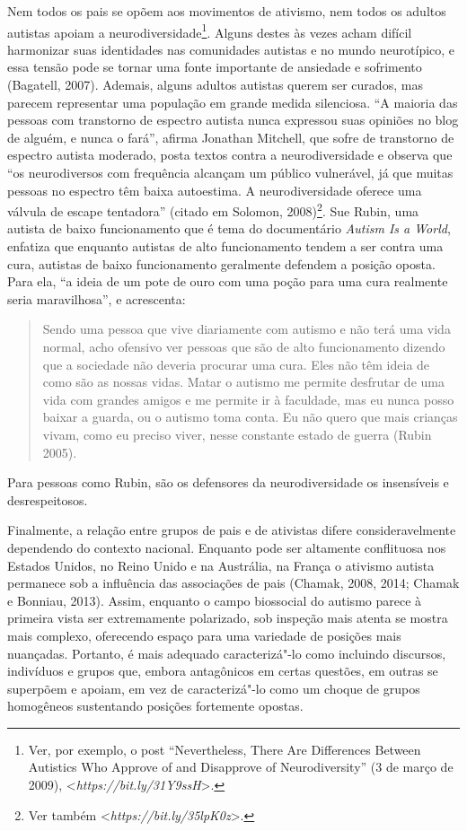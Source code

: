 Nem todos os pais se opõem aos movimentos de ativismo, nem todos os
adultos autistas apoiam a neurodiversidade\footnote[15]{Ver, por exemplo, o post ``Nevertheless, There Are Differences
Between Autistics Who Approve of and Disapprove of Neurodiversity'' (3
de março de 2009),
\textless{}\emph{https://bit.ly/31Y9ssH}\textgreater{}.}. Alguns
destes às vezes acham difícil harmonizar suas identidades nas
comunidades autistas e no mundo neurotípico, e essa tensão pode se
tornar uma fonte importante de ansiedade e sofrimento (Bagatell, 2007).
Ademais, alguns adultos autistas querem ser curados, mas parecem
representar uma população em grande medida silenciosa. ``A maioria das
pessoas com transtorno de espectro autista nunca expressou suas opiniões
no blog de alguém, e nunca o fará'', afirma Jonathan Mitchell, que sofre
de transtorno de espectro autista moderado, posta textos contra a
neurodiversidade e observa que ``os neurodiversos com frequência
alcançam um público vulnerável, já que muitas pessoas no espectro têm
baixa autoestima. A neurodiversidade oferece uma válvula de escape
tentadora'' (citado em Solomon, 2008)\footnote[16]{Ver também \textless{}\emph{https://bit.ly/35lpK0z}\textgreater{}.}. Sue Rubin,
uma autista de baixo funcionamento que é tema do documentário
\emph{Autism Is a World}, enfatiza que enquanto autistas de alto
funcionamento tendem a ser contra uma cura, autistas de baixo
funcionamento geralmente defendem a posição oposta. Para ela, ``a ideia
de um pote de ouro com uma poção para uma cura realmente seria
maravilhosa'', e acrescenta:

\begin{quote}
Sendo uma pessoa que vive diariamente com autismo e não terá uma vida
normal, acho ofensivo ver pessoas que são de alto funcionamento dizendo
que a sociedade não deveria procurar uma cura. Eles não têm ideia de
como são as nossas vidas. Matar o autismo me permite desfrutar de uma
vida com grandes amigos e me permite ir à faculdade, mas eu nunca posso
baixar a guarda, ou o autismo toma conta. Eu não quero que mais crianças
vivam, como eu preciso viver, nesse constante estado de guerra (Rubin
2005).
\end{quote}

Para pessoas como Rubin, são os defensores da neurodiversidade os
insensíveis e desrespeitosos.

Finalmente, a relação entre grupos de pais e de ativistas difere
consideravelmente dependendo do contexto nacional. Enquanto pode ser
altamente conflituosa nos Estados Unidos, no Reino Unido e na Austrália,
na França o ativismo autista permanece sob a influência das associações
de pais (Chamak, 2008, 2014; Chamak e Bonniau, 2013). Assim, enquanto o
campo biossocial do autismo parece à primeira vista ser extremamente
polarizado, sob inspeção mais atenta se mostra mais complexo, oferecendo
espaço para uma variedade de posições mais nuançadas. Portanto, é mais
adequado caracterizá"-lo como incluindo discursos, indivíduos e grupos
que, embora antagônicos em certas questões, em outras se superpõem e
apoiam, em vez de caracterizá"-lo como um choque de grupos homogêneos
sustentando posições fortemente opostas.

